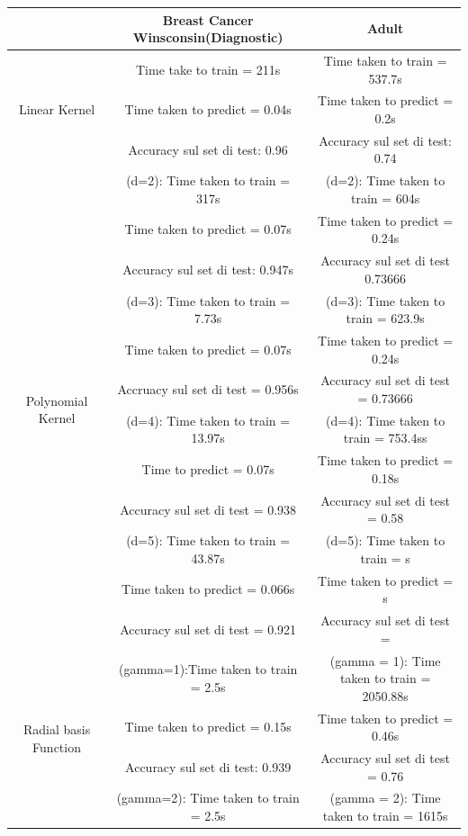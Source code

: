 \documentclass{article}
\begin{document}
	\begin{table}[htbp]
	\centering
	\begin{tabular}{|c|c|c|}
	  \hline
	  \multicolumn{1}{|c|}{} & \multicolumn{1}{c|}{Breast Cancer Winsconsin(Diagnostic)} & \multicolumn{1}{c|}{Adult} \\
	  \hline
	  \multirow{3}{*}{Linear Kernel} & Time take to train = 211s & Time taken to train = 537.7s\\
	  & Time taken to predict = 0.04s & Time taken to predict = 0.2s\\
	  & Accuracy sul set di test: 0.96 & Accuracy sul set di test: 0.74\\
	  \hline
	  \multirow{12}{*}{Polynomial Kernel} & (d=2): Time taken to train = 317s & (d=2): Time taken to train = 604s \\
	  & Time taken to predict = 0.07s & Time taken to predict = 0.24s\\
	  & Accuracy sul set di test: 0.947s & Accuracy sul set di test 0.73666\\
	  & (d=3): Time taken to train = 7.73s & (d=3): Time taken to train = 623.9s\\
	  & Time taken to predict = 0.07s & Time taken to predict = 0.24s\\
	  & Accruacy sul set di test = 0.956s & Accuracy sul set di test = 0.73666\\
	  & (d=4): Time taken to train = 13.97s & (d=4): Time taken to train = 753.4ss\\
	  & Time to predict = 0.07s & Time taken to predict = 0.18s\\
	  & Accuracy sul set di test = 0.938 & Accuracy sul set di test = 0.58\\
	  & (d=5): Time taken to train = 43.87s & (d=5): Time taken to train = s\\
	  & Time taken to predict = 0.066s & Time taken to predict = s\\
	  & Accuracy sul set di test = 0.921 & Accuracy sul set di test = \\
	  \hline
	  \multirow{12}{*}{Radial basis Function} & (gamma=1):Time taken to train = 2.5s & (gamma = 1): Time taken to train = 2050.88s\\
	  & Time taken to predict = 0.15s& Time taken to predict = 0.46s\\
	  & Accuracy sul set di test: 0.939 & Accuracy sul set di test = 0.76\\
	  & (gamma=2): Time taken to train = 2.5s & (gamma = 2): Time taken to train = 1615s\\

\end{tabular}
\end{table}
\end{document}
